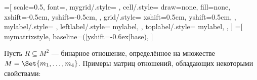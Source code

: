 \documentclass[a4paper,10pt]{article}
\begin{document}
\newcommand\drawlabelnorth[1]{%
    \node[above,align=center] at (current bounding box.north) {#1};
}
\newcommand\drawlabelsouth[1]{%
    \node[below,align=center] at (current bounding box.south) {#1};
}

=[
    scale=0.5,
    font=\small,
    mygrid/.style={
    },
    cell/.style={ %
        draw=none,
        fill=none,
        xshift=-0.5cm,
        yshift=-0.5cm,
    },
    grid/.style={ %
        xshift=0.5cm,
        yshift=0.5cm,
    },
    mylabel/.style={
    },
    leftlabel/.style={
        mylabel,
    },
    toplabel/.style={
        mylabel,
    },
]
=[
    mymatrixstyle,
    baseline={([yshift=-0.6ex]base)},
]

\def\matrixsize{4}

Пусть $R \subseteq M^2$ --- бинарное отношение, определённое на множестве $M = \Set{m_1, \dotsc, m_{\matrixsize}}$.
Примеры матриц отношений, обладающих некоторыми свойствами:
\end{document}
